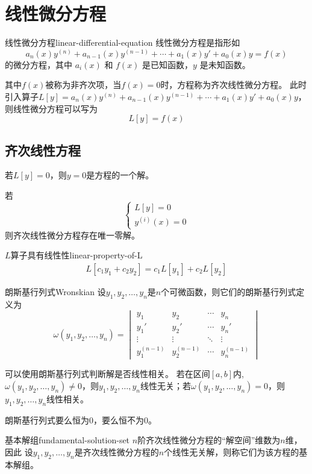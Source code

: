 \documentclass[math]{amznotes}
\begin{document}
\setlength{\parindent}{2em}
\setcounter{tocdepth}{2} %
\tableofcontents
\newpage
\chapter{线性微分方程}
\begin{dfnbox}{线性微分方程}{linear-differential-equation}
	线性微分方程是指形如
	\begin{equation*}
		a_n(x)y^{(n)} + a_{n-1}(x)y^{(n-1)} + \cdots + a_1(x)y' + a_0(x)y = f(x)
	\end{equation*}
	的微分方程，其中 $a_i(x)$ 和 $f(x)$ 是已知函数，$y$ 是未知函数。
\end{dfnbox}
其中$f(x)$被称为非齐次项，当$f(x) = 0$时，方程称为齐次线性微分方程。
此时引入算子$L[y] = a_n(x)y^{(n)} + a_{n-1}(x)y^{(n-1)} + \cdots + a_1(x)y' + a_0(x)y$，则线性微分方程可以写为
\begin{equation*}
	L[y] = f(x)
\end{equation*}
\section{齐次线性方程}
若$L[y] = 0$，则$y = 0$是方程的一个解。

若\begin{equation*}
	\left\{
	\begin{split}
		L[y] = 0 \\
		y^{(i)}(x) = 0
	\end{split}
	\right.
\end{equation*}
则齐次线性微分方程存在唯一零解。
\begin{tecbox}{$L$算子具有线性性}{linear-property-of-L}
	\begin{eqnarray*}
		L[c_1y_1 + c_2y_2] = c_1L[y_1] + c_2L[y_2]
	\end{eqnarray*}
\end{tecbox}
\begin{dfnbox}{朗斯基行列式}{Wronskian}
	设$y_1, y_2, \ldots, y_n$是$n$个可微函数，则它们的朗斯基行列式定义为
	\begin{equation*}
		\omega(y_1, y_2, \ldots, y_n) =
		\begin{vmatrix}
			y_1         & y_2         & \cdots & y_n         \\
			y_1'        & y_2'        & \cdots & y_n'        \\
			\vdots      & \vdots      & \ddots & \vdots      \\
			y_1^{(n-1)} & y_2^{(n-1)} & \cdots & y_n^{(n-1)}
		\end{vmatrix}
	\end{equation*}
\end{dfnbox}
可以使用朗斯基行列式判断解是否线性相关。
若在区间$[a, b]$内,$\omega(y_1, y_2, \ldots, y_n) \neq 0$，则$y_1, y_2, \ldots, y_n$线性无关；若$\omega(y_1, y_2, \ldots, y_n) = 0$，则$y_1, y_2, \ldots, y_n$线性相关。
\begin{notebox}
	朗斯基行列式要么恒为0，要么恒不为0。
\end{notebox}
\begin{dfnbox}{基本解组}{fundamental-solution-set}
	$n$阶齐次线性微分方程的``解空间''维数为$n$维，因此
	设$y_1, y_2, \ldots, y_n$是齐次线性微分方程的$n$个线性无关解，则称它们为该方程的基本解组。
\end{dfnbox}
\end{document}
